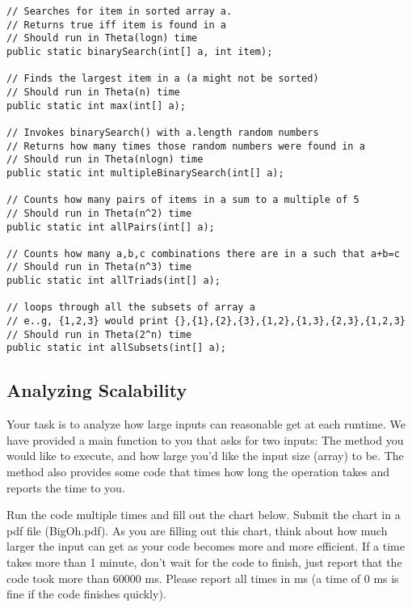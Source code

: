 \documentclass[paper=a4, fontsize=11pt, parskip=full]{scrartcl} %
\numberwithin{equation}{section} %
\numberwithin{figure}{section} %
\numberwithin{table}{section} %
\begin{document}
\begin{lstlisting}
// Searches for item in sorted array a.
// Returns true iff item is found in a
// Should run in Theta(logn) time
public static binarySearch(int[] a, int item);

// Finds the largest item in a (a might not be sorted)
// Should run in Theta(n) time
public static int max(int[] a);

// Invokes binarySearch() with a.length random numbers
// Returns how many times those random numbers were found in a
// Should run in Theta(nlogn) time
public static int multipleBinarySearch(int[] a);

// Counts how many pairs of items in a sum to a multiple of 5
// Should run in Theta(n^2) time
public static int allPairs(int[] a);

// Counts how many a,b,c combinations there are in a such that a+b=c
// Should run in Theta(n^3) time
public static int allTriads(int[] a);

// loops through all the subsets of array a
// e..g, {1,2,3} would print {},{1},{2},{3},{1,2},{1,3},{2,3},{1,2,3}
// Should run in Theta(2^n) time
public static int allSubsets(int[] a);
\end{lstlisting}


\subsection{Analyzing Scalability}

Your task is to analyze how large inputs can reasonable get at each runtime. We have provided a main function to you that asks for two inputs: The method you would like to execute, and how large you'd like the input size (array) to be. The method also provides some code that times how long the operation takes and reports the time to you.

Run the code multiple times and fill out the chart below. Submit the chart in a pdf file (BigOh.pdf). As you are filling out this chart, think about how much larger the input can get as your code becomes more and more efficient. If a time takes more than 1 minute, don't wait for the code to finish, just report that the code took more than 60000 ms. Please report all times in ms (a time of 0 ms is fine if the code finishes quickly). 
\end{document}
